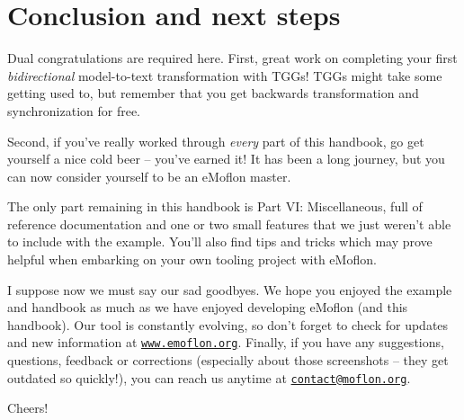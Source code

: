 \newpage
\section{Conclusion and next steps}
\genHeader

Dual congratulations are required here. First, great work on completing your first \emph{bidirectional} model-to-text transformation with TGGs! TGGs
might take some getting used to, but remember that you get backwards transformation and synchronization for free.

Second, if you've really worked through \emph{every} part of this handbook, go get yourself a nice cold beer -- you've earned it! It
has been a long journey, but you can now consider yourself to be an eMoflon master.

The only part remaining in this handbook is Part VI: Miscellaneous, full of reference documentation and one or two small features that we just weren't able to
include with the example. You'll also find tips and tricks which may prove helpful when embarking on your own tooling project with eMoflon.

I suppose now we must say our sad goodbyes. We hope you enjoyed the example and handbook as much as we have enjoyed developing eMoflon (and this handbook). Our
tool is constantly evolving, so don't forget to check for updates and new information at \texttt{\url{www.emoflon.org}}. Finally, if you have any suggestions,
questions, feedback or corrections (especially about those screenshots -- they get outdated so quickly!), you can reach us anytime at
\texttt{\href{mailto:contact@moflon.org}{contact@moflon.org}}.

Cheers!
